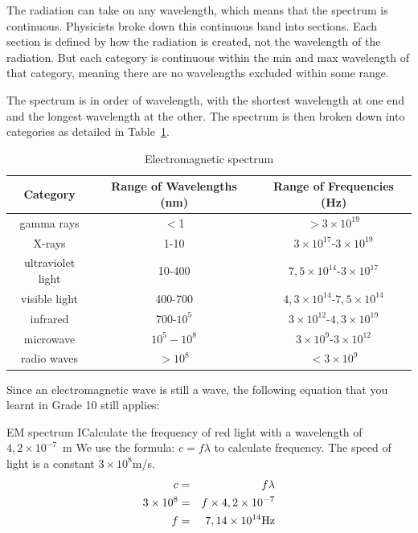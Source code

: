 The radiation can take on any wavelength, which means that the spectrum is continuous. Physicists broke down this continuous band into sections. Each section is defined by how the radiation is created, not the wavelength of the radiation. But each category is continuous within the min and max wavelength of that category, meaning there are no wavelengths excluded within some range. 

The spectrum is in order of wavelength, with the shortest wavelength at one end and the longest wavelength at the other. The spectrum is then broken down into categories as detailed in Table~\ref{tab:emspectrum}.

\begin{table}[htbp]
\begin{center}
\caption{Electromagnetic spectrum}
\label{tab:emspectrum}
\begin{tabular}{|c|c|c|}\hline
\textbf{Category}&\textbf{Range of Wavelengths (nm)}&\textbf{Range of Frequencies (Hz)}\\\hline\hline
gamma rays&$<$1&$>3\times 10^{19}$ \\\hline
X-rays&1-10&$3\times 10^{17}$-$3\times 10^{19}$\\\hline
ultraviolet light&10-400&$7,5\times 10^{14}$-$3\times 10^{17}$\\\hline
visible light&400-700&$4,3\times 10^{14}$-$7,5\times 10^{14}$\\\hline
infrared&700-$10^{5}$&$3\times 10^{12}$-$4,3\times 10^{19}$\\\hline
microwave&$10^{5}-10^{8}$&$3\times 10^{9}$-$3\times 10^{12}$\\\hline
radio waves&$>10^{8}$&$<3\times 10^{9}$\\\hline
\end{tabular}
\end{center}
\end{table}


Since an electromagnetic wave is still a wave, the following equation that you learnt in Grade 10 still applies:


\begin{wex}{EM spectrum I}{Calculate the frequency of red light with a wavelength of $4,2 \times 10^{-7}$~m}{ 
We use the formula: $c=f\lambda$ to calculate frequency. The speed of light is a constant $3 \times 10^{8}$m/s.
\begin{eqnarray*}
c&=&f\lambda\\
3 \times 10^{8}&=&f \times 4,2 \times 10^{-7} \\
f &=& 7,14 \times 10^{14} \rm {Hz}
\end{eqnarray*}}
\end{wex}

